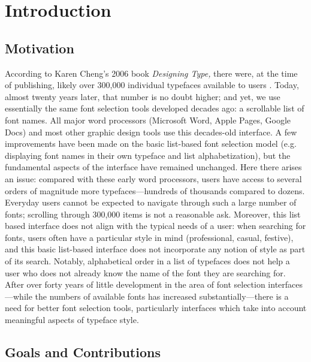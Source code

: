 \chapter{Introduction}
\label{chap:introduction}

\section{Motivation}

According to Karen Cheng's 2006 book \textit{Designing Type,} there were, at the time of publishing, likely over 300,000 individual typefaces available to users \cite{cheng2006}. Today, almost twenty years later, that number is no doubt higher; and yet, we use essentially the same font selection tools developed decades ago: a scrollable list of font names. All major word processors (Microsoft Word, Apple Pages, Google Docs) and most other graphic design tools use this decades-old interface. A few improvements have been made on the basic list-based font selection model (e.g. displaying font names in their own typeface and list alphabetization), but the fundamental aspects of the interface have remained unchanged. Here there arises an issue: compared with these early word processors, users have access to several orders of magnitude more typefaces---hundreds of thousands compared to dozens. Everyday users cannot be expected to navigate through such a large number of fonts; scrolling through 300,000 items is not a reasonable ask. Moreover, this list based interface does not align with the typical needs of a user: when searching for fonts, users often have a particular style in mind (professional, casual, festive), and this basic list-based interface does not incorporate any notion of style as part of its search. Notably, alphabetical order in a list of typefaces does not help a user who does not already know the name of the font they are searching for. After over forty years of little development in the area of font selection interfaces---while the numbers of available fonts has increased substantially---there is a need for better font selection tools, particularly interfaces which take into account meaningful aspects of typeface style.

\section{Goals and Contributions}

